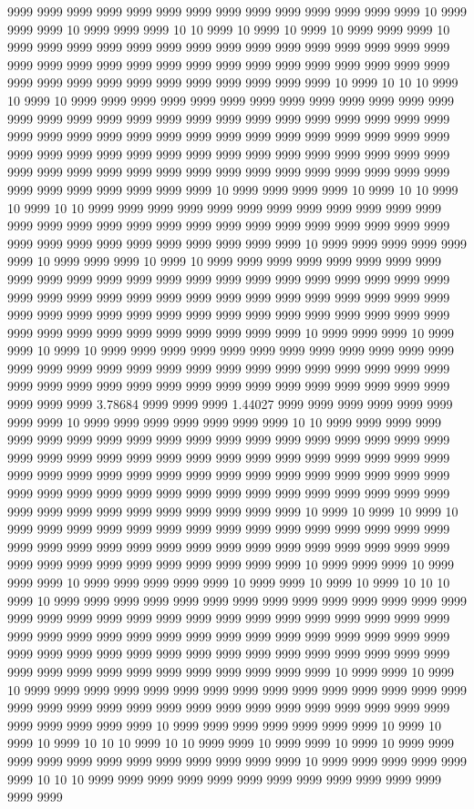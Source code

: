 9999 9999 9999 9999 9999 9999 9999 9999 9999 9999 9999 9999 9999 9999 10 9999 9999 9999 10 9999 9999 9999 10 10 9999 10 9999 10 9999 10 9999 9999 9999 10 9999 9999 9999 9999 9999 9999 9999 9999 9999 9999 9999 9999 9999 9999 9999 9999 9999 9999 9999 9999 9999 9999 9999 9999 9999 9999 9999 9999 9999 9999 9999 9999 9999 9999 9999 9999 9999 9999 9999 9999 9999 10 9999 10 10 10 9999 10 9999 10 9999 9999 9999 9999 9999 9999 9999 9999 9999 9999 9999 9999 9999 9999 9999 9999 9999 9999 9999 9999 9999 9999 9999 9999 9999 9999 9999 9999 9999 9999 9999 9999 9999 9999 9999 9999 9999 9999 9999 9999 9999 9999 9999 9999 9999 9999 9999 9999 9999 9999 9999 9999 9999 9999 9999 9999 9999 9999 9999 9999 9999 9999 9999 9999 9999 9999 9999 9999 9999 9999 9999 9999 9999 9999 9999 9999 9999 9999 9999 9999 10 9999 9999 9999 9999 10 9999 10 10 9999 10 9999 10 10 9999 9999 9999 9999 9999 9999 9999 9999 9999 9999 9999 9999 9999 9999 9999 9999 9999 9999 9999 9999 9999 9999 9999 9999 9999 9999 9999 9999 9999 9999 9999 9999 9999 9999 9999 9999 9999 10 9999 9999 9999 9999 9999 9999 10 9999 9999 9999 10 9999 10 9999 9999 9999 9999 9999 9999 9999 9999 9999 9999 9999 9999 9999 9999 9999 9999 9999 9999 9999 9999 9999 9999 9999 9999 9999 9999 9999 9999 9999 9999 9999 9999 9999 9999 9999 9999 9999 9999 9999 9999 9999 9999 9999 9999 9999 9999 9999 9999 9999 9999 9999 9999 9999 9999 9999 9999 9999 9999 9999 9999 9999 9999 9999 10 9999 9999 9999 10 9999 9999 10 9999 10 9999 9999 9999 9999 9999 9999 9999 9999 9999 9999 9999 9999 9999 9999 9999 9999 9999 9999 9999 9999 9999 9999 9999 9999 9999 9999 9999 9999 9999 9999 9999 9999 9999 9999 9999 9999 9999 9999 9999 9999 9999 9999 9999 9999 9999 3.78684 9999 9999 9999 1.44027 9999 9999 9999 9999 9999 9999 9999 9999 10 9999 9999 9999 9999 9999 9999 9999 10 10 9999 9999 9999 9999 9999 9999 9999 9999 9999 9999 9999 9999 9999 9999 9999 9999 9999 9999 9999 9999 9999 9999 9999 9999 9999 9999 9999 9999 9999 9999 9999 9999 9999 9999 9999 9999 9999 9999 9999 9999 9999 9999 9999 9999 9999 9999 9999 9999 9999 9999 9999 9999 9999 9999 9999 9999 9999 9999 9999 9999 9999 9999 9999 9999 9999 9999 9999 9999 9999 9999 9999 9999 9999 9999 10 9999 10 9999 10 9999 10 9999 9999 9999 9999 9999 9999 9999 9999 9999 9999 9999 9999 9999 9999 9999 9999 9999 9999 9999 9999 9999 9999 9999 9999 9999 9999 9999 9999 9999 9999 9999 9999 9999 9999 9999 9999 9999 9999 9999 9999 10 9999 9999 9999 10 9999 9999 9999 10 9999 9999 9999 9999 9999 10 9999 9999 10 9999 10 9999 10 10 10 9999 10 9999 9999 9999 9999 9999 9999 9999 9999 9999 9999 9999 9999 9999 9999 9999 9999 9999 9999 9999 9999 9999 9999 9999 9999 9999 9999 9999 9999 9999 9999 9999 9999 9999 9999 9999 9999 9999 9999 9999 9999 9999 9999 9999 9999 9999 9999 9999 9999 9999 9999 9999 9999 9999 9999 9999 9999 9999 9999 9999 9999 9999 9999 9999 9999 9999 9999 9999 9999 9999 9999 10 9999 9999 10 9999 10 9999 9999 9999 9999 9999 9999 9999 9999 9999 9999 9999 9999 9999 9999 9999 9999 9999 9999 9999 9999 9999 9999 9999 9999 9999 9999 9999 9999 9999 9999 9999 9999 9999 9999 9999 10 9999 9999 9999 9999 9999 9999 9999 10 9999 10 9999 10 9999 10 10 10 9999 10 10 9999 9999 10 9999 9999 10 9999 10 9999 9999 9999 9999 9999 9999 9999 9999 9999 9999 9999 9999 10 9999 9999 9999 9999 9999 9999 10 10 10 9999 9999 9999 9999 9999 9999 9999 9999 9999 9999 9999 9999 9999 9999 